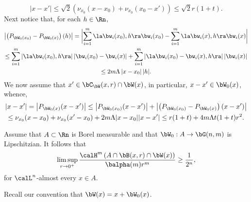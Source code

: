 \begin{Empty}[Polyballs]
\[
|x-x'| \leq \sqrt{2} \left(\nu_{x_0}(x-x_0) + \nu_{x_0}(x_0-x') \right) \leq \sqrt{2} r (1+t).
\]
Next notice that, for each $h \in \Rn$,
\begin{multline*}
\left| \left(P_{\bW_0(x_0)} - P_{\bW_0(x)} \right) (h) \right| = \biggl| \sum_{i=1}^m \la \bw_i(x_0), h \ra \bw_i(x_0) - \sum_{i=1}^m \la \bw_i(x), h \ra \bw_i(x)\biggr| \\
\leq \sum_{i=1}^m \left| \la \bw_i(x_0),h \ra \right| \left| \bw_i(x_0) - \bw_i(x) \right| + \sum_{i=1}^m \left| \la \bw_i(x_0) - \bw_i(x), h \ra \right| \left| \bw_i(x) \right| \\
\leq 2 m \Lambda \left| x-x_0 \right| |h|.
\end{multline*}
We now assume that $x' \in \bC_\bW(x,r) \cap \bW(x)$, in particular, $x-x' \in \bW_0(x)$, whence,
\begin{multline*}
\left| x-x' \right| = \left| P_{\bW_0(x)}(x-x')\right| \leq \left| P_{\bW_0(x_0)}(x-x')\right| + \left| \left(P_{\bW_0(x_0)} - P_{\bW_0(x)}\right)(x-x')\right| \\
\leq \nu_{x_0}(x-x_0) + \nu_{x_0}(x'-x_0) + 2 m \Lambda |x-x_0| |x-x'| \leq r(1+t) + 4m \Lambda t(1+t) r^2.
\end{multline*}
\end{Empty}

\begin{theorem}
\label{main.density}
Assume that $A \subset \Rn$ is Borel measurable and that $\bW_0: A \to \bG(n,m)$ is Lipschitzian.
It follows that
\begin{equation*}
\limsup_{r \to 0^+} \frac{\calH^m\left(A \cap \bB(x,r) \cap \bW(x)\right)}{\balpha(m)r^m} \geq \frac{1}{2^n},
\end{equation*}
for $\calL^n$-almost every $x \in A$.
\end{theorem}

Recall our convention that $\bW(x) = x + \bW_0(x)$.

